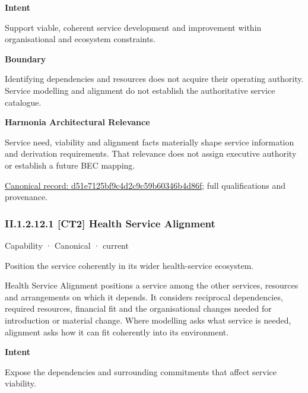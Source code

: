 \textbf{Intent}



Support viable, coherent service development and improvement within organisational and ecosystem constraints.



\textbf{Boundary}



Identifying dependencies and resources does not acquire their operating authority. Service modelling and alignment do not establish the authoritative service catalogue.



\textbf{Harmonia Architectural Relevance}



Service need, viability and alignment facts materially shape service information and derivation requirements. That relevance does not assign executive authority or establish a future BEC mapping.


{\footnotesize \href{../../../../../../../continuum/strategy/capability/d51e7125bf9c4d2c9c59b60346b4d86f.md}{Canonical record: d51e7125bf9c4d2c9c59b60346b4d86f}; full qualifications and provenance.}\par
\subsubsection*{II.1.2.12.1 [CT2] Health Service Alignment}
\label{navigation:II.1.2.12.1}

\label{element:d4fc5367352741a99bd334f7e8bf5856}
{\small Capability · Canonical · current}\par

Position the service coherently in its wider health-service ecosystem.



Health Service Alignment positions a service among the other services, resources and arrangements on which it depends. It considers reciprocal dependencies, required resources, financial fit and the organisational changes needed for introduction or material change. Where modelling asks what service is needed, alignment asks how it can fit coherently into its environment.



\textbf{Intent}



Expose the dependencies and surrounding commitments that affect service viability.



